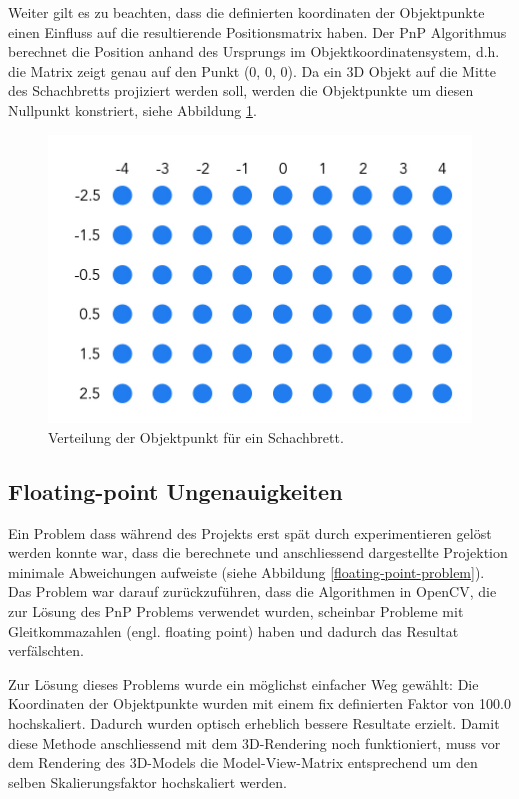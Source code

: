 Weiter gilt es zu beachten, dass die definierten koordinaten der Objektpunkte einen Einfluss auf die resultierende Positionsmatrix haben. Der PnP Algorithmus berechnet die Position anhand des Ursprungs im Objektkoordinatensystem, d.h. die Matrix zeigt genau auf den Punkt (0, 0, 0). 
Da ein 3D Objekt auf die Mitte des Schachbretts projiziert werden soll, werden die Objektpunkte um diesen Nullpunkt konstriert, siehe Abbildung \ref{fig:object-points}.

\begin{figure}[!ht]
\centering
\includegraphics[scale=0.5]{images/object-points.jpg} 
\caption{Verteilung der Objektpunkt für ein Schachbrett.}
\label{fig:object-points}
\end{figure}


\subsection{Floating-point Ungenauigkeiten}

Ein Problem dass während des Projekts erst spät durch experimentieren gelöst werden konnte war, dass die berechnete und anschliessend dargestellte Projektion minimale Abweichungen aufweiste (siehe Abbildung \ref{floating-point-problem}). Das Problem war darauf zurückzuführen, dass die Algorithmen in OpenCV, die zur Lösung des PnP Problems verwendet wurden, scheinbar Probleme mit Gleitkommazahlen (engl. floating point) haben und dadurch das Resultat verfälschten.

Zur Lösung dieses Problems wurde ein möglichst einfacher Weg gewählt: Die Koordinaten der Objektpunkte wurden mit einem fix definierten Faktor von 100.0 hochskaliert. Dadurch wurden optisch erheblich bessere Resultate erzielt. Damit diese Methode anschliessend mit dem 3D-Rendering noch funktioniert, muss vor dem Rendering des 3D-Models die Model-View-Matrix entsprechend um den selben Skalierungsfaktor hochskaliert werden.

